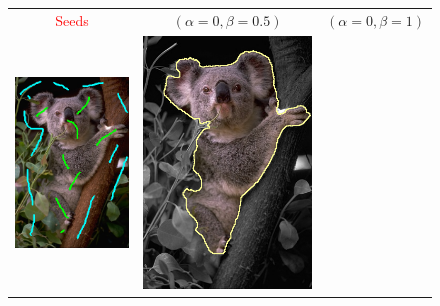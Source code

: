 \documentclass[smallextended]{svjour3}       %
\newcommand{\revision}[1]{\textcolor{red}{#1}}
\begin{document}
{{\begin{figure}[ht!]
\center
\begin{tabular}{ccc}
\revision{Seeds} & $(\alpha=0, \beta=0.5)$ & $(\alpha=0,\beta=1)$ \\
 	\includegraphics[scale=0.25]{images/segmentation/bc/coala/seeds.png} & 
	\includegraphics[scale=0.25]{images/segmentation/bc/coala/r3/lg0_sq05_dt1_it50.png} & 

\end{tabular}
\end{figure}}}
\end{document}
